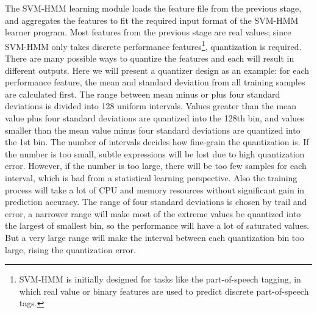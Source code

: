 The SVM-HMM learning module loads the feature file from the previous stage, and aggregates the features to fit the required input format of the SVM-HMM learner program. Most features from the previous stage are real values; since SVM-HMM only takes discrete performance features\footnote{SVM-HMM is initially designed for tasks like the part-of-speech tagging, in which real value or binary features are used to predict discrete part-of-speech tags.}, quantization is required. There are many possible ways to quantize the features and each will result in different outputs. Here we will present a quantizer design as an example: for each performance feature, the mean and standard deviation from all training samples are calculated first. The range between mean minus or plus four standard deviations is divided into 128 uniform intervals. Values greater than the mean value plus four standard deviations are quantized into the 128th bin, and values smaller than the mean value minus four standard deviations are quantized into the 1st bin. The number of intervals decides how fine-grain the quantization is. If the number is too small, subtle expressions will be lost due to high quantization error. However, if the number is too large, there will be too few samples for each interval, which is bad from a statistical learning perspective. Also the training process will take a lot of CPU and memory resources without significant gain in prediction accuracy. The range of four standard deviations is chosen by trail and error, a narrower range will make most of the extreme values be quantized into the largest of smallest bin, so the performance will have a lot of saturated values. But a very large range will make the interval between each quantization bin too large, rising the quantization error. %

